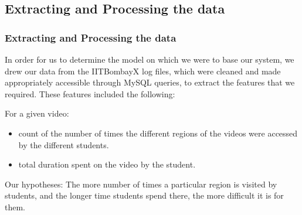 \documentclass[12pt,xcolor=dvipsnames]{beamer}
\begin{document}
\subsection{Extracting and Processing the data}
\begin{frame}[t]
\frametitle{Extracting and Processing the data}

In order for us to determine the model on which we were to base our system, we drew our data from the  IITBombayX log files, which were cleaned and made appropriately accessible through MySQL queries, to extract the features that we required. These features included the following:

For a given video:
\begin{itemize}

\item count of the number of times the different regions of the videos were accessed by the different students.
\item total duration spent on the video by the student.

\end{itemize}

\begin{large}
 Our hypotheses: The more number of times a particular region is visited by students, and the longer time students spend there, the more difficult it is for them.
\end{large}

\end{frame}
\end{document}
